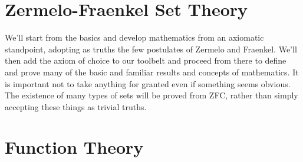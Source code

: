 \chapter{Zermelo-Fraenkel Set Theory}
    We'll start from the basics and develop mathematics from an axiomatic
    standpoint, adopting as truths the few postulates of Zermelo and
    Fraenkel. We'll then add the axiom of choice to our toolbelt and
    proceed from there to define and prove many of the basic and familiar
    results and concepts of mathematics. It is important not to take anything
    for granted even if something seems obvious. The existence of many types
    of sets will be proved from ZFC, rather than simply accepting these
    things as trivial truths.
    \ifcsname\PATH\endcsname
        \newcommand{\PATH}{books/Foundations/Zermelo_Fraenkel_Set_Theory}
    \else
        \renewcommand{\PATH}{books/Foundations/Zermelo_Fraenkel_Set_Theory}
    \fi

    
    
\chapter{Function Theory}
    